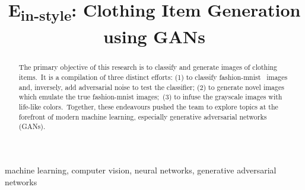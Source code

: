 \documentclass[conference]{IEEEtran}
\begin{document}
    \title{E\textsubscript{in-style}: Clothing Item Generation using GANs}

    \author{
    \and
    \and
    \and
    }

    \maketitle

    \begin{abstract}

        The primary objective of this research is to classify and generate images of clothing items.\ It is a compilation of three distinct efforts: (1) to classify fashion-mnist~\cite{xiao2017/online} images and, inversely, add adversarial noise to test the classifier; (2) to generate novel images which emulate the true fashion-mnist images;\ (3) to infuse the grayscale images with life-like colors.\ Together, these endeavours pushed the team to explore topics at the forefront of modern machine learning, especially generative adversarial networks (GANs).

    \end{abstract}

    \begin{IEEEkeywords}
        machine learning, computer vision, neural networks, generative adversarial networks
    \end{IEEEkeywords}
\end{document}
